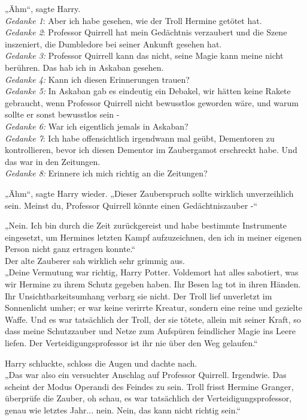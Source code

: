 {„Ähm“, sagte Harry.\\ \emph{Gedanke 1}: Aber ich habe gesehen, wie der Troll Hermine getötet hat.\\ \emph{Gedanke 2}: Professor Quirrell hat mein Gedächtnis verzaubert und die Szene inszeniert, die Dumbledore bei seiner Ankunft gesehen hat.\\ \emph{Gedanke 3:} Professor Quirrell kann das nicht, seine Magie kann meine nicht berühren. Das hab ich in Askaban gesehen.\\ \emph{Gedanke 4:} Kann ich diesen Erinnerungen trauen?\\ \emph{Gedanke 5:} In Askaban gab es eindeutig ein Debakel, wir hätten keine Rakete gebraucht, wenn Professor Quirrell nicht bewusstlos geworden wäre, und warum sollte er sonst bewusstlos sein -\\ \emph{Gedanke 6:} War ich eigentlich jemals in Askaban?\\ \emph{Gedanke 7}: Ich habe offensichtlich irgendwann mal geübt, Dementoren zu kontrollieren, bevor ich diesen Dementor im Zaubergamot erschreckt habe. Und das war in den Zeitungen.\\ \emph{Gedanke 8:} Erinnere ich mich richtig an die Zeitungen?

„Ähm“, sagte Harry wieder. „Dieser Zauberspruch sollte wirklich unverzeihlich sein. Meinst du, Professor Quirrell könnte einen Gedächtniszauber -“

„Nein. Ich bin durch die Zeit zurückgereist und habe bestimmte Instrumente eingesetzt, um Hermines letzten Kampf aufzuzeichnen, den ich in meiner eigenen Person nicht ganz ertragen konnte.“\\ Der alte Zauberer sah wirklich sehr grimmig aus.\\ „Deine Vermutung war richtig, Harry Potter. Voldemort hat alles sabotiert, was wir Hermine zu ihrem Schutz gegeben haben. Ihr Besen lag tot in ihren Händen. Ihr Unsichtbarkeitsumhang verbarg sie nicht. Der Troll lief unverletzt im Sonnenlicht umher; er war keine verirrte Kreatur, sondern eine reine und gezielte Waffe. Und es war tatsächlich der Troll, der sie tötete, allein mit seiner Kraft, so dass meine Schutzzauber und Netze zum Aufspüren feindlicher Magie ins Leere liefen. Der Verteidigungsprofessor ist ihr nie über den Weg gelaufen.“

Harry schluckte, schloss die Augen und dachte nach.\\ „Das war also ein versuchter Anschlag auf Professor Quirrell. Irgendwie. Das scheint der Modus Operandi des Feindes zu sein. Troll frisst Hermine Granger, überprüfe die Zauber, oh schau, es war tatsächlich der Verteidigungsprofessor, genau wie letztes Jahr... nein. Nein, das kann nicht richtig sein.“

}

